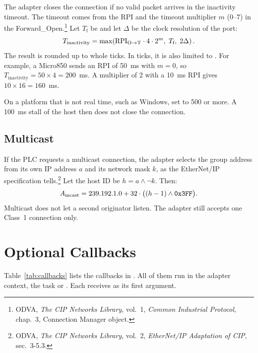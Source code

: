 The adapter closes the connection if no valid \OT{} packet arrives in the
inactivity timeout. The timeout comes from the \OT{} RPI and the timeout
multiplier $m$ (0--7) in the Forward\_Open.\footnote{ODVA, \textit{The CIP
Networks Library}, vol.~1, \textit{Common Industrial Protocol}, chap.~3,
Connection Manager object.} Let $T_{\text{f}}$ be
 and let $\Delta$ be the clock resolution of the port:
\begin{equation}
  T_{\text{inactivity}} = \max\!\left(\text{RPI}_{\OT} \cdot 4 \cdot 2^{m},\;
  T_{\text{f}},\; 2\Delta\right).
  \label{eq:timeout}
\end{equation}
The result is rounded up to whole ticks. In ticks, it is also limited to
. For example, a Micro850 sends an RPI of 50~ms with $m = 0$,
so $T_{\text{inactivity}} = 50 \times 4 = 200$~ms. A multiplier of 2 with a
10~ms RPI gives $10 \times 16 = 160$~ms.

\begin{note}
\notelabel On a platform that is not real time, such as Windows, set
 to 500 or more. A 100~ms stall of the host then does
not close the connection.
\end{note}

\subsection{Multicast \TO}

If the PLC requests a multicast \TO{} connection, the adapter selects the
group address from its own IP address $a$ and its network mask $k$, as the
EtherNet/IP specification tells.\footnote{ODVA, \textit{The CIP Networks
Library}, vol.~2, \textit{EtherNet/IP Adaptation of CIP}, sec.~3-5.3.} Let the
host ID be $h = a \wedge \lnot k$. Then:
\begin{equation}
  A_{\text{mcast}} = 239.192.1.0 + 32 \cdot \bigl((h - 1) \wedge \texttt{0x3FF}\bigr).
\end{equation}
Multicast does not let a second originator listen. The adapter still accepts
one Class~1 connection only.

\section{Optional Callbacks}\label{sec:callbacks}

Table~\ref{tab:callbacks} lists the callbacks in . All
of them run in the adapter context, the task or . Each
receives  as its first argument.

